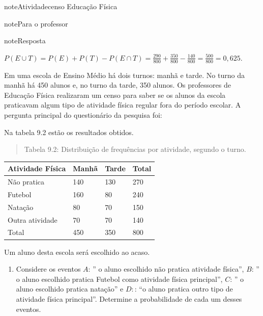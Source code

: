 \begin{sphinxadmonition}{note}{Atividade}{censo Educação Física}
\begin{sphinxadmonition}{note}{Para o professor}
\begin{sphinxadmonition}{note}{Resposta}
\begin{enumerate}
\end{enumerate}

\(P(E\cup T)=P(E)+P(T)-P(E\cap T)=\frac{290}{800}+\frac{350}{800}-\frac{140}{800}=\frac{500}{800}=0,625\).
\end{sphinxadmonition}
\end{sphinxadmonition}

Em uma escola de Ensino Médio há dois turnos: manhã e tarde. No turno da manhã há 450 alunos e, no turno da tarde, 350 alunos. Os professores de Educação Física realizaram um censo para saber se os alunos da escola praticavam algum tipo de atividade física regular fora do período escolar. A pergunta principal do questionário da pesquisa foi:



Na tabela 9.2 estão os resultados obtidos.
\begin{quote}

Tabela 9.2: Distribuição de frequências por atividade, segundo o turno.
\end{quote}


\begin{savenotes}\sphinxattablestart
\centering
\begin{tabulary}{\linewidth}[t]{|T|T|T|T|}
\hline

Atividade Física
&
Manhã
&
Tarde
&
Total
\\
\hline
Não pratica
&
140
&
130
&
270
\\
\hline
Futebol
&
160
&
80
&
240
\\
\hline
Natação
&
80
&
70
&
150
\\
\hline
Outra atividade
&
70
&
70
&
140
\\
\hline
Total
&
450
&
350
&
800
\\
\hline
\end{tabulary}
\par
\sphinxattableend\end{savenotes}

Um aluno desta escola será escolhido ao acaso.
\begin{enumerate}
\item {} 
Considere os eventos \(A\):  ” o aluno escolhido não pratica atividade física”, \(B\): ” o aluno escolhido pratica Futebol como atividade física principal”, \(C\): ” o aluno escolhido pratica natação” e \(D:\): “o aluno pratica outro tipo de atividade física principal”. Determine a probabilidade de cada um desses eventos.


\end{enumerate}
\end{sphinxadmonition}
